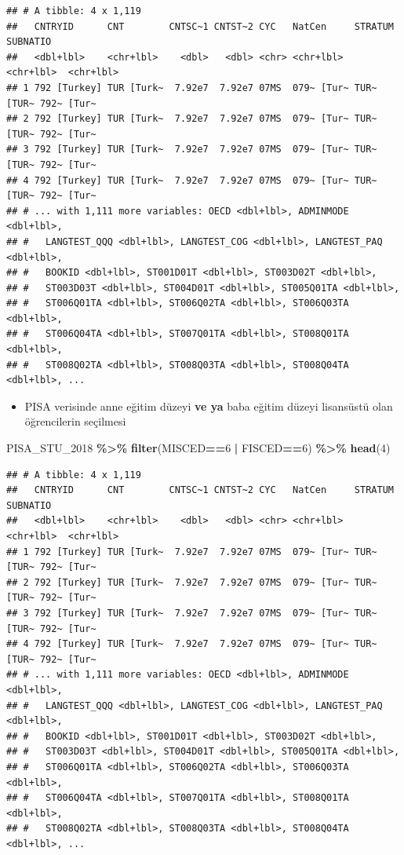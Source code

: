 \documentclass[
  oneside]{book}
\newenvironment{Shaded}{\begin{snugshade}}{\end{snugshade}}
\newcommand{\DecValTok}[1]{\textcolor[rgb]{0.00,0.00,0.81}{#1}}
\newcommand{\FunctionTok}[1]{\textcolor[rgb]{0.13,0.29,0.53}{\textbf{#1}}}
\newcommand{\NormalTok}[1]{#1}
\newcommand{\SpecialCharTok}[1]{\textcolor[rgb]{0.81,0.36,0.00}{\textbf{#1}}}
\providecommand{\tightlist}{%
  \setlength{\itemsep}{0pt}\setlength{\parskip}{0pt}}
\begin{document}
\begin{verbatim}
## # A tibble: 4 x 1,119
##   CNTRYID      CNT        CNTSC~1 CNTST~2 CYC   NatCen     STRATUM    SUBNATIO  
##   <dbl+lbl>    <chr+lbl>    <dbl>   <dbl> <chr> <chr+lbl>  <chr+lbl>  <chr+lbl> 
## 1 792 [Turkey] TUR [Turk~  7.92e7  7.92e7 07MS  079~ [Tur~ TUR~ [TUR~ 792~ [Tur~
## 2 792 [Turkey] TUR [Turk~  7.92e7  7.92e7 07MS  079~ [Tur~ TUR~ [TUR~ 792~ [Tur~
## 3 792 [Turkey] TUR [Turk~  7.92e7  7.92e7 07MS  079~ [Tur~ TUR~ [TUR~ 792~ [Tur~
## 4 792 [Turkey] TUR [Turk~  7.92e7  7.92e7 07MS  079~ [Tur~ TUR~ [TUR~ 792~ [Tur~
## # ... with 1,111 more variables: OECD <dbl+lbl>, ADMINMODE <dbl+lbl>,
## #   LANGTEST_QQQ <dbl+lbl>, LANGTEST_COG <dbl+lbl>, LANGTEST_PAQ <dbl+lbl>,
## #   BOOKID <dbl+lbl>, ST001D01T <dbl+lbl>, ST003D02T <dbl+lbl>,
## #   ST003D03T <dbl+lbl>, ST004D01T <dbl+lbl>, ST005Q01TA <dbl+lbl>,
## #   ST006Q01TA <dbl+lbl>, ST006Q02TA <dbl+lbl>, ST006Q03TA <dbl+lbl>,
## #   ST006Q04TA <dbl+lbl>, ST007Q01TA <dbl+lbl>, ST008Q01TA <dbl+lbl>,
## #   ST008Q02TA <dbl+lbl>, ST008Q03TA <dbl+lbl>, ST008Q04TA <dbl+lbl>, ...
\end{verbatim}

\begin{itemize}
\tightlist
\item
  PISA verisinde anne eğitim düzeyi \textbf{ve ya} baba eğitim düzeyi lisansüstü olan öğrencilerin seçilmesi
\end{itemize}

\begin{Shaded}
\begin{Highlighting}[]
\NormalTok{PISA\_STU\_2018 }\SpecialCharTok{\%\textgreater{}\%} \FunctionTok{filter}\NormalTok{(MISCED}\SpecialCharTok{==}\DecValTok{6} \SpecialCharTok{|}\NormalTok{ FISCED}\SpecialCharTok{==}\DecValTok{6}\NormalTok{) }\SpecialCharTok{\%\textgreater{}\%} \FunctionTok{head}\NormalTok{(}\DecValTok{4}\NormalTok{)}
\end{Highlighting}
\end{Shaded}

\begin{verbatim}
## # A tibble: 4 x 1,119
##   CNTRYID      CNT        CNTSC~1 CNTST~2 CYC   NatCen     STRATUM    SUBNATIO  
##   <dbl+lbl>    <chr+lbl>    <dbl>   <dbl> <chr> <chr+lbl>  <chr+lbl>  <chr+lbl> 
## 1 792 [Turkey] TUR [Turk~  7.92e7  7.92e7 07MS  079~ [Tur~ TUR~ [TUR~ 792~ [Tur~
## 2 792 [Turkey] TUR [Turk~  7.92e7  7.92e7 07MS  079~ [Tur~ TUR~ [TUR~ 792~ [Tur~
## 3 792 [Turkey] TUR [Turk~  7.92e7  7.92e7 07MS  079~ [Tur~ TUR~ [TUR~ 792~ [Tur~
## 4 792 [Turkey] TUR [Turk~  7.92e7  7.92e7 07MS  079~ [Tur~ TUR~ [TUR~ 792~ [Tur~
## # ... with 1,111 more variables: OECD <dbl+lbl>, ADMINMODE <dbl+lbl>,
## #   LANGTEST_QQQ <dbl+lbl>, LANGTEST_COG <dbl+lbl>, LANGTEST_PAQ <dbl+lbl>,
## #   BOOKID <dbl+lbl>, ST001D01T <dbl+lbl>, ST003D02T <dbl+lbl>,
## #   ST003D03T <dbl+lbl>, ST004D01T <dbl+lbl>, ST005Q01TA <dbl+lbl>,
## #   ST006Q01TA <dbl+lbl>, ST006Q02TA <dbl+lbl>, ST006Q03TA <dbl+lbl>,
## #   ST006Q04TA <dbl+lbl>, ST007Q01TA <dbl+lbl>, ST008Q01TA <dbl+lbl>,
## #   ST008Q02TA <dbl+lbl>, ST008Q03TA <dbl+lbl>, ST008Q04TA <dbl+lbl>, ...
\end{verbatim}
\end{document}
